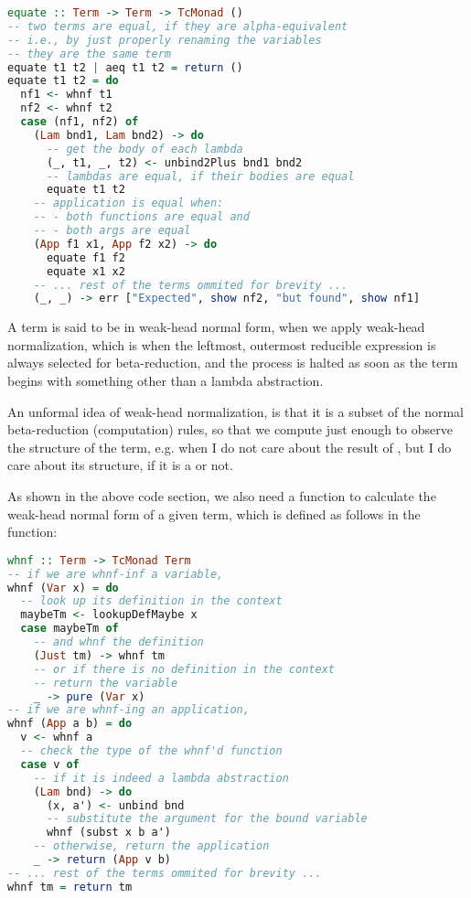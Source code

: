 \begin{lstlisting}[language=Haskell]
equate :: Term -> Term -> TcMonad ()
-- two terms are equal, if they are alpha-equivalent
-- i.e., by just properly renaming the variables
-- they are the same term
equate t1 t2 | aeq t1 t2 = return ()
equate t1 t2 = do
  nf1 <- whnf t1
  nf2 <- whnf t2
  case (nf1, nf2) of
    (Lam bnd1, Lam bnd2) -> do
      -- get the body of each lambda
      (_, t1, _, t2) <- unbind2Plus bnd1 bnd2
      -- lambdas are equal, if their bodies are equal
      equate t1 t2
    -- application is equal when:
    -- - both functions are equal and
    -- - both args are equal
    (App f1 x1, App f2 x2) -> do
      equate f1 f2
      equate x1 x2
    -- ... rest of the terms ommited for brevity ...
    (_, _) -> err ["Expected", show nf2, "but found", show nf1]
\end{lstlisting}


\begin{definition}
       A term is said to be in weak-head normal form, when we apply weak-head normalization, which is when the leftmost, outermost reducible expression is always selected for beta-reduction, and the process is halted as soon as the term begins with something other than a lambda abstraction.~\cite{advancedtapl}

       An unformal idea of weak-head normalization, is that it is a subset of the normal beta-reduction (computation) rules, so that we compute just enough to observe the structure of the term, e.g. when I do not care about the result of , but I do care about its structure, if it is a  or not.
\end{definition}

As shown in the above code section, we also need a function to calculate the weak-head normal form of a given term, which is defined as follows in the  function:

\begin{lstlisting}[language=Haskell]
whnf :: Term -> TcMonad Term
-- if we are whnf-inf a variable,
whnf (Var x) = do
  -- look up its definition in the context
  maybeTm <- lookupDefMaybe x
  case maybeTm of
    -- and whnf the definition
    (Just tm) -> whnf tm
    -- or if there is no definition in the context
    -- return the variable 
    _ -> pure (Var x)
-- if we are whnf-ing an application,
whnf (App a b) = do
  v <- whnf a
  -- check the type of the whnf'd function
  case v of
    -- if it is indeed a lambda abstraction
    (Lam bnd) -> do
      (x, a') <- unbind bnd
      -- substitute the argument for the bound variable
      whnf (subst x b a')
    -- otherwise, return the application
    _ -> return (App v b)
-- ... rest of the terms ommited for brevity ...
whnf tm = return tm
\end{lstlisting}

